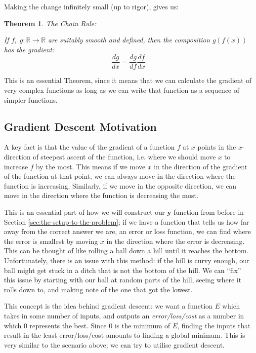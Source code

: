 \documentclass[a4paper]{article}
\theoremstyle{plain} %
\newtheorem{theorem}{Theorem}[section]
\theoremstyle{definition} %
\numberwithin{equation}{subsection}
\newcommand{\R}{\mathbb{R}}
\newcommand{\vy}{{\textbf{y}}}
\begin{document}
Making the change infinitely small (up to rigor), gives us:
\begin{theorem} \label{th:chain-rule-1d}
  The Chain Rule:

  If $f, \; g : \R \rightarrow \R $ are suitably smooth and defined, then the composition $g(f(x))$ has the gradient:
  \[\frac{dg}{dx} = \frac{dg}{df}\frac{df}{dx}\]
\end{theorem}

This is an essential Theorem, since it means that we can calculate the gradient of very complex functions as long as we can write that function as a sequence of simpler functions.

\subsection{Gradient Descent Motivation}

A key fact is that the value of the gradient of a function $f$ at $x$ points in the $x$-direction of steepest ascent of the function, i.e. where we should move $x$ to increase $f$ by the most. This means if we move $x$ in the direction of the gradient of the function at that point, we can always move in the direction where the function is increasing.
Similarly, if we move in the opposite direction, we can move in the direction where the function is decreasing the most.

This is an essential part of how we will construct our $\vy$ function from before in Section \ref{sec:the-setup-to-the-problem}; if we have a function that tells us how far away from the correct answer we are, an error or loss function, we can find where the 
error is smallest by moving $x$ in the direction where the error is decreasing. This can be thought of like rolling a ball down a hill until it reaches the bottom. Unfortunately, there is an issue with this method: 
if the hill is curvy enough, our ball might get stuck in a ditch that is not the bottom of the hill. We can ``fix'' this issue by starting with our ball at random parts of the hill, seeing where it rolls down to, and making note of the one that got the lowest.

This concept is the idea behind gradient descent: we want a function $E$ 
which takes in some number of inputs, and outputs an \emph{error/loss/cost} as a number in which 0 represents the best. Since 0 is the minimum of $E$, finding the inputs that result in the least error/loss/cost amounts to finding a global minimum. 
This is very similar to the scenario above; we can try to utilise gradient descent.
\end{document}

